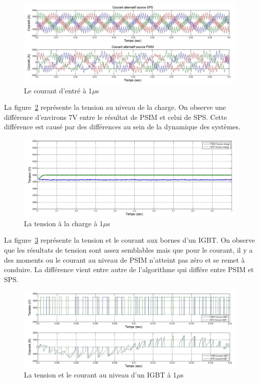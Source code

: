 \documentclass[11pt,letterpaper,final]{report}
\begin{document}
\begin{figure}[htb]
\centering
\includegraphics[scale=0.5]{Fig/AFERC/cour_al.jpg}
\caption{Le courant d'entré à 1$\mu$s}
\label{AF_RC_cou}
\end{figure}

La figure~\ref{AF_RC_ten} représente la tension au niveau de la charge. On observe une différence d'environs 7V entre le résultat de PSIM et celui de SPS. Cette différence est causé par des différences au sein de la dynamique des systèmes.


\begin{figure}[htb]
\centering
\includegraphics[scale=0.5]{Fig/AFERC/vch.jpg}
\caption{La tension à la charge à 1$\mu$s}
\label{AF_RC_ten}
\end{figure}

La figure~\ref{AF_RC_igbt} représente la tension et le courant aux bornes d'un IGBT. On observe que les résultats de tension sont assez semblables mais que pour le courant, il y a des moments ou le courant au niveau de PSIM n'atteint pas zéro et se remet à conduire. La différence vient entre autre de l'algorithme qui différe entre PSIM et SPS.

\begin{figure}[htb]
\centering
\includegraphics[scale=0.5]{Fig/AFERC/IGBT.jpg}
\caption{La tension et le courant au niveau d'un IGBT à 1$\mu$s}
\label{AF_RC_igbt}
\end{figure}
\end{document}
